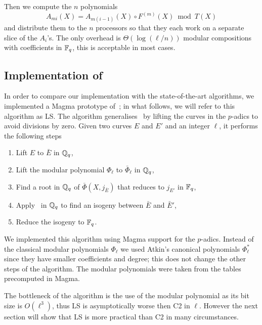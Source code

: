 Then we compute the $n$ polynomials
\begin{equation*}
  A_{mi}(X) = A_{m(i-1)}(X) \circ F^{(m)}(X) \bmod T(X)
\end{equation*}
and distribute them to the $n$ processors so that they each work on a
separate slice of the $A_i$'s. The only overhead is $\Theta(\log
(\ell/n))$ modular compositions with coefficients in $\mathbb{F}_q$, this is
acceptable in most cases.


\subsection{Implementation of~\cite{LeSi09}}
In order to compare our implementation with the state-of-the-art
algorithms, we implemented a Magma prototype of~\cite{LeSi09}; in what
follows, we will refer to this algorithm as LS. The algorithm
generalises~\cite{BoMoSaSc08} by lifting the curves in the $p$-adics
to avoid divisions by zero. Given two curves $E$ and $E'$ and an
integer $\ell$, it performs the following steps
\begin{enumerate}
\item Lift $E$ to $\bar{E}$ in $\mathbb{Q}_q$,
\item Lift the modular polynomial $\Phi_\ell$ to $\bar{\Phi}_\ell$ in
  $\mathbb{Q}_q$,
\item Find a root in $\mathbb{Q}_q$ of $\bar{\Phi}(X,j_{\bar{E}})$ that
  reduces to $j_{E'}$ in $\mathbb{F}_q$,
\item Apply~\cite{BoMoSaSc08} in $\mathbb{Q}_q$ to find an isogeny between
  $\bar{E}$ and $\bar{E}'$,
\item Reduce the isogeny to $\mathbb{F}_q$.
\end{enumerate}

We implemented this algorithm using Magma support for the
$p$-adics. Instead of the classical modular polynomials $\Phi_\ell$ we
used Atkin's canonical polynomials $\Phi^\ast_\ell$ since they have
smaller coefficients and degree; this does not change the other steps
of the algorithm. The modular polynomials were taken from the tables
precomputed in Magma.

The bottleneck of the algorithm is the use of the modular polynomial
as its bit size is $O(\ell^3)$, thus LS is asymptotically worse then
C2 in $\ell$. However the next section will show that LS is more
practical than C2 in many circumstances.



%
